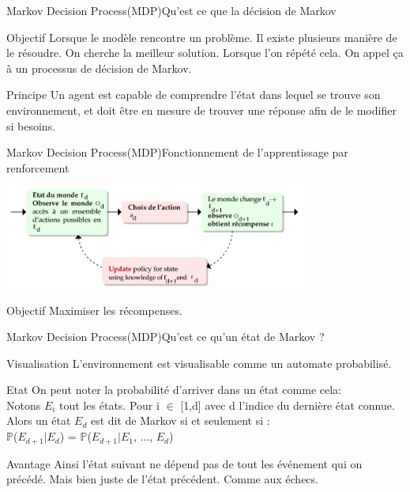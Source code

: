 
\begin{frame}{Markov Decision Process(MDP)}{Qu'est ce que la décision de Markov}
	\begin{center}
		
		\begin{block}{Objectif}
			Lorsque le modèle rencontre un problème. Il existe plusieurs manière de le résoudre. On cherche la meilleur solution. Lorsque l'on répété cela. On appel ça à un processus de décision de Markov. 
		\end{block}
		\begin{block}{Principe}
			Un agent est capable de comprendre l’état dans lequel se trouve son environnement, et doit être en mesure de trouver une réponse afin de le modifier si besoins.
		\end{block}
	\end{center}
\end{frame}
\begin{frame}{Markov Decision Process(MDP)}{Fonctionnement de l'apprentissage par renforcement}
	\begin{center}
		\includegraphics[width=10cm]{ressources/MDP/Fonctionnement.jpg}
	\end{center}
	\begin{block}{Objectif}
		Maximiser les récompenses.
	\end{block}
\end{frame}
\begin{frame}{Markov Decision Process(MDP)}{Qu'est ce qu'un état de Markov ?}
	\begin{center}
		
		\begin{block}{Visualisation}
			L'environnement est visualisable comme un automate probabilisé.
		\end{block}
		\begin{block}{Etat}
			On peut noter la probabilité d'arriver dans un état comme cela:\\
			Notons $E_{i}$ tout les états. Pour i $\in$ [1,d] avec d l'indice du dernière état connue.\\
			Alors un état $E_d$ est dit de Markov si et seulement si :\\ 
			$\mathbb{P}$($E_{d+1} | E_{d}$) = $\mathbb{P}$($E_{d+1} | E_{1}$, ..., $E_{d}$)\\
		\end{block}
		\begin{block}{Avantage}
			Ainsi l'état suivant ne dépend pas de tout les événement qui on précédé. Mais bien juste de l'état précédent. Comme aux échecs.
		\end{block}
	\end{center}
\end{frame}
